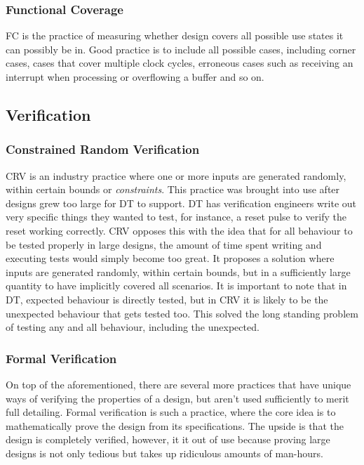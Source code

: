 \documentclass[11pt,british]{article}
\begin{document}
\subsubsection{Functional Coverage}
\gls{FC} is the practice of measuring whether design covers all possible use states it can possibly be in. Good practice is to include all possible cases, including corner cases, cases that cover multiple clock cycles, erroneous cases such as receiving an interrupt when processing or overflowing a buffer and so on. 

\subsection{Verification}

\subsubsection{Constrained Random Verification}
\gls{CRV} is an industry practice where one or more inputs are generated randomly, within certain bounds or \emph{constraints}. This practice was brought into use after designs grew too large for \gls{DT} to support. DT has verification engineers write out very specific things they wanted to test, for instance, a reset pulse to verify the reset working correctly. CRV opposes this with the idea that for all behaviour to be tested properly in large designs, the amount of time spent writing and executing tests would simply become too great. It proposes a solution where inputs are generated randomly, within certain bounds, but in a sufficiently large quantity to have implicitly covered all scenarios. It is important to note that in DT, expected behaviour is directly tested, but in CRV it is likely to be the unexpected behaviour that gets tested too. This solved the long standing problem of testing any and all behaviour, including the unexpected.

\subsubsection{Formal Verification}
On top of the aforementioned, there are several more practices that have unique ways of verifying the properties of a design, but aren't used sufficiently to merit full detailing. Formal verification is such a practice, where the core idea is to mathematically prove the design from its specifications. The upside is that the design is completely verified, however, it it out of use because proving large designs is not only tedious but takes up ridiculous amounts of man-hours.
\end{document}

